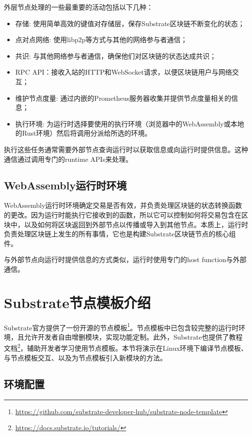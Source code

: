 外层节点处理的一些最重要的活动包括以下几种：

\begin{itemize}
    \item 存储: 使用简单高效的键值对存储层，保存Substrate区块链不断变化的状态；
    \item 点对点网络: 使用libp2p等方式与其他的网络参与者通信；
    \item 共识: 与其他网络参与者通信，确保他们对区块链的状态达成共识；
    \item RPC API：接收入站的HTTP和WebSocket请求，以便区块链用户与网络交互；
    \item 维护节点度量: 通过内嵌的Prometheus服务器收集并提供节点度量相关的信息；
    \item 执行环境: 为运行时选择要使用的执行环境（浏览器中的WebAssembly或本地的Rust环境）然后将调用分派给所选的环境。
\end{itemize}

执行这些任务通常需要外部节点查询运行时以获取信息或向运行时提供信息。这种通信通过调用专门的runtime APIs来处理。

\subsection{WebAssembly运行时环境}

WebAssembly运行时环境确定交易是否有效，并负责处理区块链的状态转换函数的更改。因为运行时能执行它接收到的函数，所以它可以控制如何将交易包含在区块中，以及如何将区块返回到外部节点以传播或导入到其他节点。本质上，运行时负责处理区块链上发生的所有事情，它也是构建Substrate区块链节点的核心组件。

与外部节点向运行时提供信息的方式类似，运行时使用专门的host function与外部通信。

\section{Substrate节点模板介绍}

Substrate官方提供了一份开源的节点模板\footnote{\url{https://github.com/substrate-developer-hub/substrate-node-template}}。节点模板中已包含较完整的运行时环境，且允许开发者自由增删模块，实现功能定制。此外，Substrate也提供了教程文档\footnote{\url{https://docs.substrate.io/tutorials/}}，辅助开发者学习使用节点模板。本节将演示在Linux环境下编译节点模板、与节点模板交互、以及为节点模板引入新模块的方法。

\subsection{环境配置}

